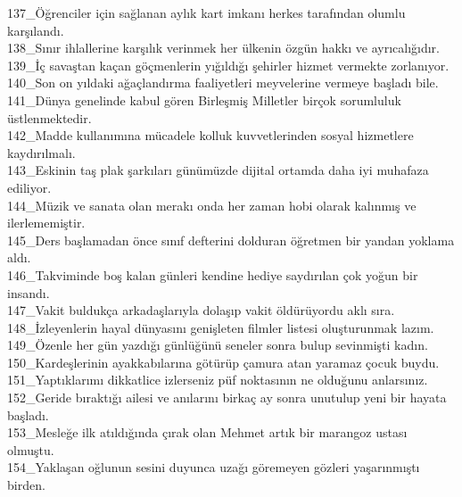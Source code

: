 \begin{myparindent}{0pt}
137\_Öğrenciler için sağlanan aylık kart imkanı herkes tarafından olumlu karşılandı.\\
138\_Sınır ihlallerine karşılık verinmek her ülkenin özgün hakkı ve ayrıcalığıdır.\\
139\_İç savaştan kaçan göçmenlerin yığıldığı şehirler hizmet vermekte zorlanıyor.\\
140\_Son on yıldaki ağaçlandırma faaliyetleri meyvelerine vermeye başladı bile.\\
141\_Dünya genelinde kabul gören Birleşmiş Milletler birçok sorumluluk üstlenmektedir.\\
142\_Madde kullanımına mücadele kolluk kuvvetlerinden sosyal hizmetlere kaydırılmalı.\\
143\_Eskinin taş plak şarkıları günümüzde dijital ortamda daha iyi muhafaza ediliyor.\\
144\_Müzik ve sanata olan merakı onda her zaman hobi olarak kalınmış ve ilerlememiştir.\\
145\_Ders başlamadan önce sınıf defterini dolduran öğretmen bir yandan yoklama aldı.\\
146\_Takviminde boş kalan günleri kendine hediye saydırılan çok yoğun bir insandı.\\
147\_Vakit buldukça arkadaşlarıyla dolaşıp vakit öldürüyordu aklı sıra.\\
148\_İzleyenlerin hayal dünyasını genişleten filmler listesi oluşturunmak lazım.\\
149\_Özenle her gün yazdığı günlüğünü seneler sonra bulup sevinmişti kadın.\\
150\_Kardeşlerinin ayakkabılarına götürüp çamura atan yaramaz çocuk buydu.\\
151\_Yaptıklarımı dikkatlice izlerseniz püf noktasının ne olduğunu anlarsınız.\\
152\_Geride bıraktığı ailesi ve anılarını birkaç ay sonra unutulup yeni bir hayata başladı.\\
153\_Mesleğe ilk atıldığında çırak olan Mehmet artık bir marangoz ustası olmuştu.\\
154\_Yaklaşan oğlunun sesini duyunca uzağı göremeyen gözleri yaşarınmıştı birden.\\

\end{myparindent}